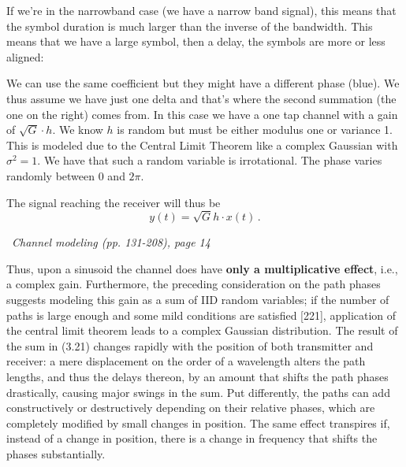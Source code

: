 \documentclass[a4paper, 12pt]{book}
\begin{document}
\begin{bluebox}
If we're in the narrowband case (we have a narrow band signal), this means that the symbol duration is much larger than the inverse of the bandwidth.
This means that we have a large symbol, then a delay, the symbols are more or less aligned:

\begin{center}
\end{center}

We can use the same coefficient but they might have a different phase (blue).
We thus assume we have just one delta and that's where the second summation (the one on the right) comes from.
In this case we have a one tap channel with a gain of $\sqrt{G} \cdot h$. We know $h$ is random but must be either modulus one or variance 1.
This is modeled due to the Central Limit Theorem like a complex Gaussian with $\sigma^2 = 1$. We have that such a random variable is irrotational. The phase varies randomly between 0 and $2\pi$.
\end{bluebox}

\newpage

The signal reaching the receiver will thus be
\[
y(t) = \sqrt{G} h \cdot x(t) \,.
\]

\begin{yellowbox}
\faBook\ \textit{Channel modeling (pp. 131-208), page 14}

Thus, upon a sinusoid the channel does have \textbf{only a multiplicative effect}, i.e., a complex gain. Furthermore, the preceding consideration on the path phases suggests modeling this gain as a sum of IID random variables; if the number of paths is large enough and some mild conditions are satisfied [221], application of the central limit theorem leads to a complex Gaussian distribution. The result of the sum in (3.21) changes rapidly with the position of both transmitter and receiver: a mere displacement on the order of a wavelength alters the path lengths, and thus the delays thereon, by an amount that shifts the path phases drastically, causing major swings in the sum. Put differently, the paths can add constructively or destructively depending on their relative phases, which are completely modified by small changes in position. The same effect transpires if, instead of a change in position, there is a change in frequency that shifts the phases substantially.
\end{yellowbox}
\end{document}
